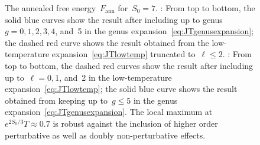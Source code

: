 \documentclass[12pt]{article}
\begin{document}
\begin{figure}[t]
\centering
{}%
\caption{The annealed free energy~$F_\mathrm{ann}$ for~$S_0 = 7$.  \protect{}: From top to bottom, the solid blue curves show the result after including up to genus~$g = 0,1,2,3,4$, and~5 in the genus expansion~\eqref{eq:JTgenusexpansion}; the dashed red curve shows the result obtained from the low-temperature expansion~\eqref{eq:JTlowtemp} truncated to~$\ell \leq 2$.  \protect{}: From top to bottom, the dashed red curves show the result after including up to~$\ell = 0,1$, and~2 in the low-temperature expansion~\eqref{eq:JTlowtemp}; the solid blue curve shows the result obtained from keeping up to~$g \leq 5$ in the genus expansion~\eqref{eq:JTgenusexpansion}.  The local maximum at~$e^{2S_0/3} T \approx 0.7$ is robust against the inclusion of higher order perturbative as well as doubly non-perturbative effects.}
\label{fig:JTgenusconverge}
\end{figure}
\end{document}
